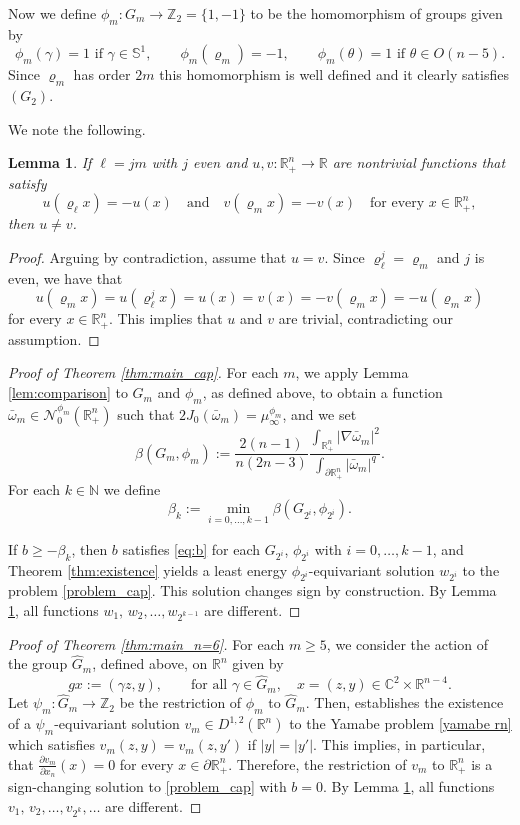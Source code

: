 \documentclass[reqno,11pt,oneside]{amsart}
\newtheorem{lemma}[theorem]{Lemma}
\numberwithin{equation}{section}
\def\r{\mathbb{R}}
\def\rn{\mathbb{R}^n}
\def\hn{\mathbb{R}^n_+}
\def\z{\mathbb{Z}}
\def\z2{\mathbb{Z}_2}
\def\n{\mathbb{N}}
\def\cc{\mathbb{C}}
\def\ihn{\int_{\hn}}
\def\idhn{\int_{\partial\hn}}
\def\vr{\varrho}
\def\cN{\mathcal{N}}
\def\what{\widehat}
\begin{document}
Now we define $\phi_m:G_m\to\mathbb{Z}_2=\{1,-1\}$ to be the homomorphism of groups given by
$$\phi_m(\gamma)=1 \text{ \ if \ }\gamma\in\mathbb{S}^1,\qquad \phi_m(\vr_m)=-1,\qquad\phi_m(\theta)=1\text{ \ if \ }\theta\in O(n-5).$$
Since $\vr_m$ has order $2m$ this homomorphism is well defined and it clearly satisfies $(G_2)$.

We note the following.

\begin{lemma}\label{lem:different}
If $\ell=jm$ with $j$ even and $u,v:\hn\to\r$ are nontrivial functions that satisfy
$$u(\vr_\ell x)=-u(x)\quad\text{and}\quad v(\vr_m x)=-v(x)\quad\text{for every \ }x\in\hn,$$
then $u\neq v$.
\end{lemma}

\begin{proof}
Arguing by contradiction, assume that $u=v$. Since $\vr_\ell^j=\vr_m$ and $j$ is even, we have that 
$$u(\vr_mx)=u(\vr_\ell^jx)=u(x)=v(x)=-v(\vr_mx)=-u(\vr_mx)$$
for every $x\in\hn$. This implies that $u$ and $v$ are trivial, contradicting our assumption.
\end{proof}
\medskip

\begin{proof}[Proof of Theorem \ref{thm:main_cap}]
For each $m$, we apply Lemma \ref{lem:comparison} to $G_m$ and $\phi_m$, as defined above, to obtain a 
function $\bar{\omega}_m\in\cN^{\phi_m}_0(\hn)$ such that $2J_0(\bar{\omega}_m)=\mu^{\phi_m}_\infty$, and we set
$$\beta(G_m,\phi_m):=\frac{2(n-1)}{n(2n-3)}\frac{\ihn|\nabla \bar{\omega}_m|^2}{\idhn |\bar{\omega}_m|^q}.$$
For each $k\in\n$ we define
$$\beta_k:=\min_{i=0,\ldots,k-1}\beta(G_{2^i},\phi_{2^i}).$$

If $b\geq -\beta_k$, then $b$ satisfies \eqref{eq:b} for each $G_{2^i}$, $\phi_{2^i}$ with $i=0,\ldots,k-1$, and Theorem \ref{thm:existence} yields a least energy $\phi_{2^i}$-equivariant solution $w_{2^i}$ to the problem \eqref{problem_cap}. This solution changes sign by construction. 
By Lemma \ref{lem:different}, all functions $w_1,\,w_2,\ldots,w_{2^{k-1}}$ are different.
\end{proof}
\medskip

\begin{proof}[Proof of Theorem \ref{thm:main_n=6}]
For each $m\geq 5$, we consider the action of the group $\what G_m$, defined above, on $\rn$ given by
\begin{equation*}
gx:=(\gamma z,y),\qquad\text{for all \ }\gamma\in\what G_m,\quad x=(z,y)\in\cc^2\times\r^{n-4}.
\end{equation*}
Let $\psi_m:\what G_m\to\z2$ be the restriction of $\phi_m$ to $\what G_m$. Then, \cite[Corollary 3.4]{c} establishes the existence of a $\psi_m$-equivariant solution $v_m\in D^{1,2}(\rn)$ to the Yamabe problem \eqref{yamabe rn} which satisfies $v_m(z,y)=v_m(z,y')$ if $|y|=|y'|$. This implies, in particular, that $\frac{\partial v_m}{\partial x_n}(x)=0$ for every $x\in\partial\hn$. Therefore, the restriction of $v_m$ to $\hn$ is a sign-changing solution to \eqref{problem_cap} with $b=0$. By Lemma \ref{lem:different}, all functions $v_1,\,v_2,\ldots,v_{2^k},\ldots$ are different.
\end{proof}




\end{document}
